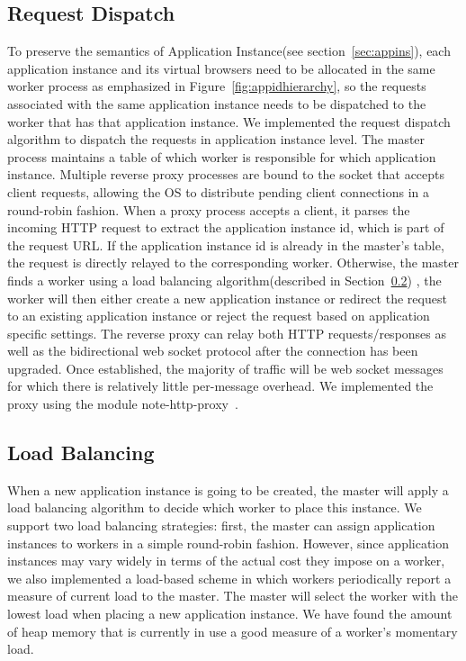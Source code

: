 \subsection{Request Dispatch}
\label{sec:reqdis}
To preserve the semantics of 
Application Instance(see section~\ref{sec:appins}),
each application instance and its virtual browsers need to be allocated in
the same worker process as emphasized in Figure~\ref{fig:appidhierarchy},
so the requests associated with the same application instance needs
to be dispatched to the worker that has that application instance.
We implemented the request dispatch algorithm 
to dispatch the requests in application instance level.
The master process maintains a 
table of which worker is responsible for which application instance.
Multiple reverse proxy processes are bound to the socket that accepts client requests, allowing
the OS to distribute pending client connections in a round-robin fashion.  
When a proxy process accepts a client, it parses the incoming HTTP request 
to extract the application instance id, which is part of the request URL.  
If the application instance id is already in the master's table, the request is directly
relayed to the corresponding worker.  
Otherwise, the master finds a worker using a load balancing algorithm(described in Section~\ref{sec:lb})
, the worker will then either create a new application instance 
or redirect the request to an existing application instance
or reject the request based on application specific settings.  
The reverse proxy can 
relay both HTTP requests/responses as well as the bidirectional web socket protocol after the
connection has been upgraded.  Once established, the majority of traffic will be web socket
messages for which there is relatively little per-message overhead.  We implemented the proxy 
using the \nodejs{} module note-http-proxy~\cite{nodeproxy}.


\subsection{Load Balancing}
\label{sec:lb}
When a new application instance is going to be created,
the master will apply a load balancing algorithm to decide which worker to place this instance.  
We support two load balancing strategies: first, the master can assign application instances
to workers in a simple round-robin fashion.  
However, since application instances may vary
widely in terms of the actual cost they impose on a worker, we also implemented a load-based
scheme in which workers periodically report a measure of current load to the master.
The master will select the worker with the lowest load when placing a new application instance.
We have found the amount of heap memory that is currently in use a good measure of a worker's 
momentary load.


